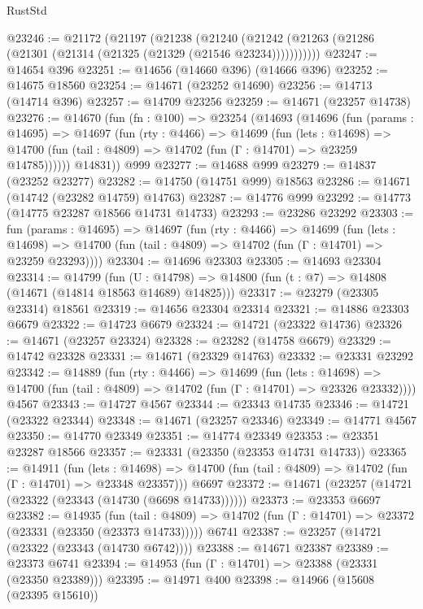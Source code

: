 \begin{lexlean}{RustStd}
\begin{coremodule}
@23246 := @21172
    (@21197
      (@21238
        (@21240 (@21242 (@21263 (@21286 (@21301 (@21314 (@21325 (@21329 (@21546 @23234)))))))))))
@23247 := @14654 @396
@23251 := @14656 (@14660 @396) (@14666 @396)
@23252 := @14675 @18560
@23254 := @14671 (@23252 @14690)
@23256 := @14713 (@14714 @396)
@23257 := @14709 @23256
@23259 := @14671 (@23257 @14738)
@23276 := @14670
    (fun (fn : @100) =>
    @23254
      (@14693
        (@14696
          (fun (params : @14695) =>
          @14697
            (fun (rty : @4466) =>
            @14699
              (fun (lets : @14698) =>
              @14700 (fun (tail : @4809) => @14702 (fun (Γ : @14701) => @23259 @14785))))))
        @14831))
    @999
@23277 := @14688 @999
@23279 := @14837 (@23252 @23277)
@23282 := @14750 (@14751 @999) @18563
@23286 := @14671 (@14742 (@23282 @14759) @14763)
@23287 := @14776 @999
@23292 := @14773 (@14775 @23287 @18566 @14731 @14733)
@23293 := @23286 @23292
@23303 := fun (params : @14695) =>
  @14697
    (fun (rty : @4466) =>
    @14699
      (fun (lets : @14698) =>
      @14700 (fun (tail : @4809) => @14702 (fun (Γ : @14701) => @23259 @23293))))
@23304 := @14696 @23303
@23305 := @14693 @23304
@23314 := @14799
    (fun (U : @14798) => @14800 (fun (t : @7) => @14808 (@14671 (@14814 @18563 @14689) @14825)))
@23317 := @23279 (@23305 @23314) @18561
@23319 := @14656 @23304 @23314
@23321 := @14886 @23303 @6679
@23322 := @14723 @6679
@23324 := @14721 (@23322 @14736)
@23326 := @14671 (@23257 @23324)
@23328 := @23282 (@14758 @6679)
@23329 := @14742 @23328
@23331 := @14671 (@23329 @14763)
@23332 := @23331 @23292
@23342 := @14889
    (fun (rty : @4466) =>
    @14699
      (fun (lets : @14698) =>
      @14700 (fun (tail : @4809) => @14702 (fun (Γ : @14701) => @23326 @23332))))
    @4567
@23343 := @14727 @4567
@23344 := @23343 @14735
@23346 := @14721 (@23322 @23344)
@23348 := @14671 (@23257 @23346)
@23349 := @14771 @4567
@23350 := @14770 @23349
@23351 := @14774 @23349
@23353 := @23351 @23287 @18566
@23357 := @23331 (@23350 (@23353 @14731 @14733))
@23365 := @14911
    (fun (lets : @14698) =>
    @14700 (fun (tail : @4809) => @14702 (fun (Γ : @14701) => @23348 @23357)))
    @6697
@23372 := @14671 (@23257 (@14721 (@23322 (@23343 (@14730 (@6698 @14733))))))
@23373 := @23353 @6697
@23382 := @14935
    (fun (tail : @4809) => @14702 (fun (Γ : @14701) => @23372 (@23331 (@23350 (@23373 @14733)))))
    @6741
@23387 := @23257 (@14721 (@23322 (@23343 (@14730 @6742))))
@23388 := @14671 @23387
@23389 := @23373 @6741
@23394 := @14953 (fun (Γ : @14701) => @23388 (@23331 (@23350 @23389)))
@23395 := @14971 @400
@23398 := @14966 (@15608 (@23395 @15610))

\end{coremodule}
\end{lexlean}
